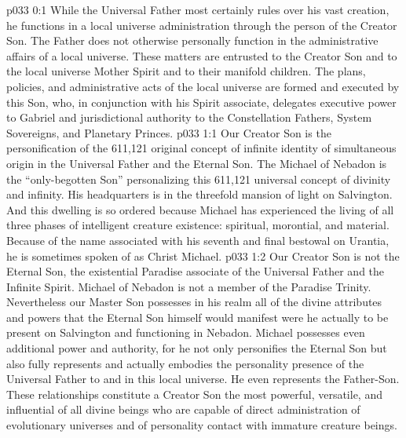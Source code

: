\author{Chief of Archangels}
\vs p033 0:1 While the Universal Father most certainly rules over his vast creation, he functions in a local universe administration through the person of the Creator Son. The Father does not otherwise personally function in the administrative affairs of a local universe. These matters are entrusted to the Creator Son and to the local universe Mother Spirit and to their manifold children. The plans, policies, and administrative acts of the local universe are formed and executed by this Son, who, in conjunction with his Spirit associate, delegates executive power to Gabriel and jurisdictional authority to the Constellation Fathers, System Sovereigns, and Planetary Princes.
\vs p033 1:1 Our Creator Son is the personification of the 611,121 original concept of infinite identity of simultaneous origin in the Universal Father and the Eternal Son. The Michael of Nebadon is the “only\hyp{}begotten Son” personalizing this 611,121 universal concept of divinity and infinity. His headquarters is in the threefold mansion of light on Salvington. And this dwelling is so ordered because Michael has experienced the living of all three phases of intelligent creature existence: spiritual, morontial, and material. Because of the name associated with his seventh and final bestowal on Urantia, he is sometimes spoken of as Christ Michael.
\vs p033 1:2 Our Creator Son is not the Eternal Son, the existential Paradise associate of the Universal Father and the Infinite Spirit. Michael of Nebadon is not a member of the Paradise Trinity. Nevertheless our Master Son possesses in his realm all of the divine attributes and powers that the Eternal Son himself would manifest were he actually to be present on Salvington and functioning in Nebadon. Michael possesses even additional power and authority, for he not only personifies the Eternal Son but also fully represents and actually embodies the personality presence of the Universal Father to and in this local universe. He even represents the Father\hyp{}Son. These relationships constitute a Creator Son the most powerful, versatile, and influential of all divine beings who are capable of direct administration of evolutionary universes and of personality contact with immature creature beings.
